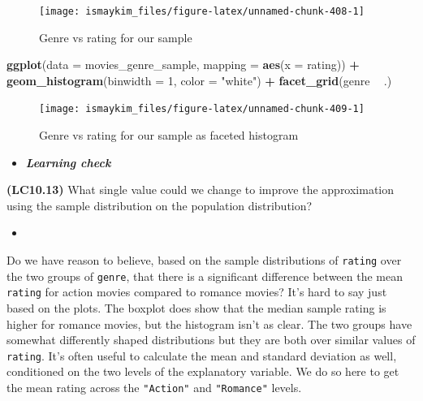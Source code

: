 \documentclass[12pt, krantz2,]{krantz}
\makeatletter
\newenvironment{Shaded}{\begin{snugshade}}{\end{snugshade}}
\newcommand{\DataTypeTok}[1]{\textcolor[rgb]{0.27,0.27,0.27}{#1}}
\newcommand{\DecValTok}[1]{\textcolor[rgb]{0.06,0.06,0.06}{#1}}
\newcommand{\KeywordTok}[1]{\textcolor[rgb]{0.27,0.27,0.27}{\textbf{#1}}}
\newcommand{\NormalTok}[1]{#1}
\newcommand{\OperatorTok}[1]{\textcolor[rgb]{0.43,0.43,0.43}{\textbf{#1}}}
\newcommand{\StringTok}[1]{\textcolor[rgb]{0.5,0.5,0.5}{#1}}
\newenvironment{kframe}{%
\medskip{}
\setlength{\fboxsep}{.8em}
 \def\at@end@of@kframe{}%
 \ifinner\ifhmode%
  \def\at@end@of@kframe{\end{minipage}}%
  \begin{minipage}{\columnwidth}%
 \fi\fi%
 \def\FrameCommand##1{\hskip\@totalleftmargin \hskip-\fboxsep
 \colorbox{shadecolor}{##1}\hskip-\fboxsep
     \hskip-\linewidth \hskip-\@totalleftmargin \hskip\columnwidth}%
 \MakeFramed {\advance\hsize-\width
   \@totalleftmargin\z@ \linewidth\hsize
   \@setminipage}}%
 {\par\unskip\endMakeFramed%
 \at@end@of@kframe}
\renewenvironment{Shaded}{\begin{kframe}}{\end{kframe}}
\newenvironment{rmdblock}[1]
  {\begin{shaded*}
  \begin{itemize}
  \renewcommand{\labelitemi}{
    \raisebox{-.7\height}[0pt][0pt]{
    }
  }
  \item
  }
  {
  \end{itemize}
  \end{shaded*}
  }
\newenvironment{learncheck}
  {\begin{rmdblock}{warning}}
  {\end{rmdblock}}
\makeatother
\begin{document}
\begin{figure}

{\centering \texttt{[image: ismaykim\_files/figure-latex/unnamed-chunk-408-1]} 

}

\caption{Genre vs rating for our sample}\label{fig:unnamed-chunk-408}
\end{figure}

\begin{Shaded}
\begin{Highlighting}[]
\KeywordTok{ggplot}\NormalTok{(}\DataTypeTok{data =}\NormalTok{ movies_genre_sample, }\DataTypeTok{mapping =} \KeywordTok{aes}\NormalTok{(}\DataTypeTok{x =}\NormalTok{ rating)) }\OperatorTok{+}
\StringTok{  }\KeywordTok{geom_histogram}\NormalTok{(}\DataTypeTok{binwidth =} \DecValTok{1}\NormalTok{, }\DataTypeTok{color =} \StringTok{"white"}\NormalTok{) }\OperatorTok{+}
\StringTok{  }\KeywordTok{facet_grid}\NormalTok{(genre }\OperatorTok{~}\StringTok{ }\NormalTok{.)}
\end{Highlighting}
\end{Shaded}

\begin{figure}

{\centering \texttt{[image: ismaykim\_files/figure-latex/unnamed-chunk-409-1]} 

}

\caption{Genre vs rating for our sample as faceted histogram}\label{fig:unnamed-chunk-409}
\end{figure}

\begin{learncheck}
\textbf{\emph{Learning check}}
\end{learncheck}

\textbf{(LC10.13)} What single value could we change to improve the approximation using the sample distribution on the population distribution?

\begin{learncheck}

\end{learncheck}

Do we have reason to believe, based on the sample distributions of \texttt{rating} over the two groups of \texttt{genre}, that there is a significant difference between the mean \texttt{rating} for action movies compared to romance movies? It's hard to say just based on the plots. The boxplot does show that the median sample rating is higher for romance movies, but the histogram isn't as clear. The two groups have somewhat differently shaped distributions but they are both over similar values of \texttt{rating}. It's often useful to calculate the mean and standard deviation as well, conditioned on the two levels of the explanatory variable. We do so here to get the mean rating across the \texttt{"Action"} and \texttt{"Romance"} levels.
\end{document}
